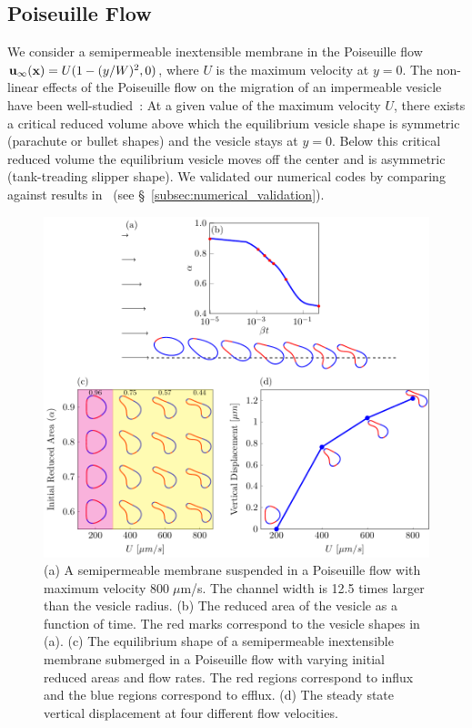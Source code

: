\documentclass[prb,preprint,showpacs,preprintnumbers,amsmath,amssymb,longbibliography]{revtex4-1}
\newif\ifTikz
\begin{document}
\subsection{Poiseuille Flow}
We consider a semipermeable inextensible membrane in the Poiseuille flow
$\mathbf{u}_\infty(\mathbf{x}) = U(1-(y/W)^2,0)$, where $U$ is the maximum velocity at
$y=0$. The non-linear effects of the Poiseuille flow on the migration of
an impermeable vesicle have been well-studied~\cite{kao-bir-mis2009}: At
a given value of the maximum velocity $U$, there exists a critical
reduced volume above which the equilibrium vesicle shape is symmetric
(parachute or bullet shapes) and the vesicle stays at $y=0$. Below this
critical reduced volume the equilibrium vesicle moves off the center and
is asymmetric (tank-treading slipper shape). We validated our numerical
codes by comparing against results in~\citet{kao-bir-mis2009} (see
\S~\ref{subsec:numerical_validation}).

\begin{figure}[htp]
  \centering
  \ifTikz
  
  \else
  \includegraphics{figures/parabolicComposite.pdf}
  \fi
  \caption{\label{fig:parabolicComposite} (a) A semipermeable membrane
  suspended in a Poiseuille flow with maximum velocity $800 \; \mu$m/s.
  The channel width is 12.5 times larger than the vesicle radius. (b)
  The reduced area of the vesicle as a function of time. The red marks
  correspond to the vesicle shapes in (a). (c) The equilibrium shape of
  a semipermeable inextensible membrane submerged in a Poiseuille flow
  with varying initial reduced areas and flow rates. The red regions
  correspond to influx and the blue regions correspond to efflux. (d)
  The steady state vertical displacement at four different flow
  velocities.}
\end{figure}
\end{document}
